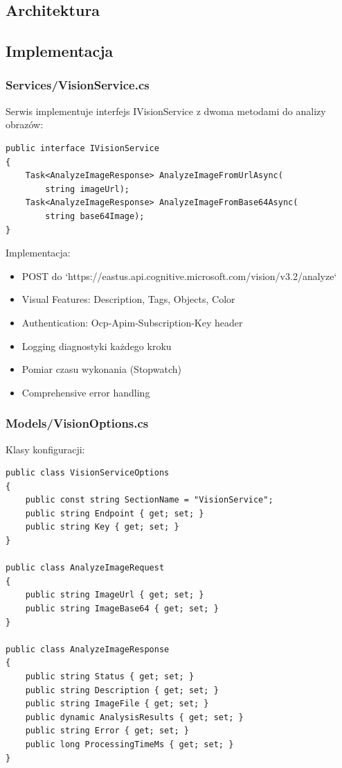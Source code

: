 \documentclass[twoside]{article}
\begin{document}
\subsection{Architektura}

\subsection{Implementacja}

\subsubsection{Services/VisionService.cs}

Serwis implementuje interfejs IVisionService z dwoma metodami do analizy obrazów:

\begin{lstlisting}
public interface IVisionService
{
    Task<AnalyzeImageResponse> AnalyzeImageFromUrlAsync(
        string imageUrl);
    Task<AnalyzeImageResponse> AnalyzeImageFromBase64Async(
        string base64Image);
}
\end{lstlisting}

Implementacja:
\begin{itemize}
	\item POST do `https://eastus.api.cognitive.microsoft.com/vision/v3.2/analyze`
	\item Visual Features: Description, Tags, Objects, Color
	\item Authentication: Ocp-Apim-Subscription-Key header
	\item Logging diagnostyki każdego kroku
	\item Pomiar czasu wykonania (Stopwatch)
	\item Comprehensive error handling
\end{itemize}

\subsubsection{Models/VisionOptions.cs}

Klasy konfiguracji:

\begin{lstlisting}
public class VisionServiceOptions
{
    public const string SectionName = "VisionService";
    public string Endpoint { get; set; }
    public string Key { get; set; }
}

public class AnalyzeImageRequest
{
    public string ImageUrl { get; set; }
    public string ImageBase64 { get; set; }
}

public class AnalyzeImageResponse
{
    public string Status { get; set; }
    public string Description { get; set; }
    public string ImageFile { get; set; }
    public dynamic AnalysisResults { get; set; }
    public string Error { get; set; }
    public long ProcessingTimeMs { get; set; }
}
\end{lstlisting}
\end{document}
